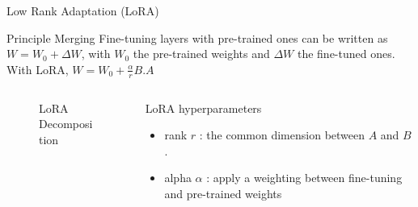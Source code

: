 \begin{frame}{Low Rank Adaptation (LoRA)}
    \begin{block}{Principle}
        Merging Fine-tuning layers with pre-trained ones can be written as $W = W_0 + \Delta W$, with $W_0$ the pre-trained weights and $\Delta W$ the fine-tuned ones. With LoRA, $W=W_0 + \frac{\alpha}{r} B.A$        
    \end{block}

    \begin{columns}
        \begin{column}[t]{0.45\textwidth}
        \begin{figure}
            \centering
            \resizebox{\textwidth}{!}{
                
            }
            \caption{LoRA Decomposition}
        \end{figure}
            
        \end{column}
        
        \begin{column}[t]{0.3\textwidth}
            \begin{block}{LoRA hyperparameters}
            \begin{itemize}
                \item rank $r$ : the common dimension between $A$ and $B$.
                \item alpha $\alpha$ : apply a weighting between fine-tuning and pre-trained weights
            \end{itemize}
                
            \end{block}
            
        \end{column}
    \end{columns}
    
\end{frame}


